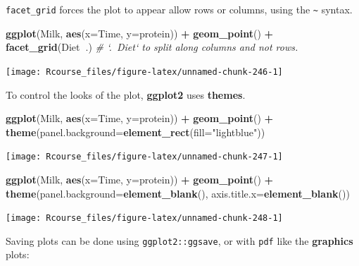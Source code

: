 \documentclass[]{book}
\newenvironment{Shaded}{\begin{snugshade}}{\end{snugshade}}
\newcommand{\KeywordTok}[1]{\textcolor[rgb]{0.13,0.29,0.53}{\textbf{#1}}}
\newcommand{\DataTypeTok}[1]{\textcolor[rgb]{0.13,0.29,0.53}{#1}}
\newcommand{\StringTok}[1]{\textcolor[rgb]{0.31,0.60,0.02}{#1}}
\newcommand{\CommentTok}[1]{\textcolor[rgb]{0.56,0.35,0.01}{\textit{#1}}}
\newcommand{\OperatorTok}[1]{\textcolor[rgb]{0.81,0.36,0.00}{\textbf{#1}}}
\newcommand{\NormalTok}[1]{#1}
\theoremstyle{definition}
\theoremstyle{definition}
\theoremstyle{definition}
\theoremstyle{remark}
\begin{document}
\texttt{facet\_grid} forces the plot to appear allow rows or columns,
using the \texttt{\textasciitilde{}} syntax.

\begin{Shaded}
\begin{Highlighting}[]
\KeywordTok{ggplot}\NormalTok{(Milk, }\KeywordTok{aes}\NormalTok{(}\DataTypeTok{x=}\NormalTok{Time, }\DataTypeTok{y=}\NormalTok{protein)) }\OperatorTok{+}
\StringTok{  }\KeywordTok{geom_point}\NormalTok{() }\OperatorTok{+}
\StringTok{  }\KeywordTok{facet_grid}\NormalTok{(Diet}\OperatorTok{~}\NormalTok{.) }\CommentTok{# `.~Diet` to split along columns and not rows.}
\end{Highlighting}
\end{Shaded}

\texttt{[image: Rcourse\_files/figure-latex/unnamed-chunk-246-1]}

To control the looks of the plot, \textbf{ggplot2} uses \textbf{themes}.

\begin{Shaded}
\begin{Highlighting}[]
\KeywordTok{ggplot}\NormalTok{(Milk, }\KeywordTok{aes}\NormalTok{(}\DataTypeTok{x=}\NormalTok{Time, }\DataTypeTok{y=}\NormalTok{protein)) }\OperatorTok{+}
\StringTok{  }\KeywordTok{geom_point}\NormalTok{() }\OperatorTok{+}
\StringTok{  }\KeywordTok{theme}\NormalTok{(}\DataTypeTok{panel.background=}\KeywordTok{element_rect}\NormalTok{(}\DataTypeTok{fill=}\StringTok{"lightblue"}\NormalTok{))}
\end{Highlighting}
\end{Shaded}

\texttt{[image: Rcourse\_files/figure-latex/unnamed-chunk-247-1]}

\begin{Shaded}
\begin{Highlighting}[]
\KeywordTok{ggplot}\NormalTok{(Milk, }\KeywordTok{aes}\NormalTok{(}\DataTypeTok{x=}\NormalTok{Time, }\DataTypeTok{y=}\NormalTok{protein)) }\OperatorTok{+}
\StringTok{  }\KeywordTok{geom_point}\NormalTok{() }\OperatorTok{+}
\StringTok{  }\KeywordTok{theme}\NormalTok{(}\DataTypeTok{panel.background=}\KeywordTok{element_blank}\NormalTok{(),}
        \DataTypeTok{axis.title.x=}\KeywordTok{element_blank}\NormalTok{())}
\end{Highlighting}
\end{Shaded}

\texttt{[image: Rcourse\_files/figure-latex/unnamed-chunk-248-1]}

Saving plots can be done using \texttt{ggplot2::ggsave}, or with
\texttt{pdf} like the \textbf{graphics} plots:
\end{document}
